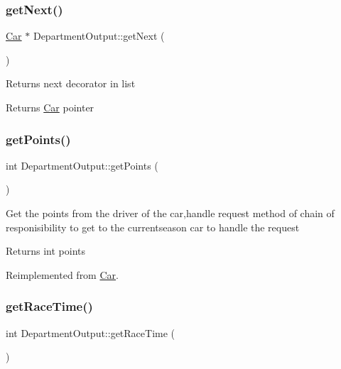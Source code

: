 \subsubsection{\texorpdfstring{get\+Next()}{getNext()}}
{\footnotesize\ttfamily \hyperlink{classCar}{Car} $\ast$ Department\+Output\+::get\+Next (\begin{DoxyParamCaption}{ }\end{DoxyParamCaption})}

Returns next decorator in list \begin{DoxyReturn}{Returns}
\hyperlink{classCar}{Car} pointer 
\end{DoxyReturn}
\mbox{\label{classDepartmentOutput_ac1eac849b183dd78906a5b2a7217b8ef}} 
\subsubsection{\texorpdfstring{get\+Points()}{getPoints()}}
{\footnotesize\ttfamily int Department\+Output\+::get\+Points (\begin{DoxyParamCaption}{ }\end{DoxyParamCaption})\hspace{0.3cm}{\ttfamily [virtual]}}

Get the points from the driver of the car,handle request method of chain of responisibility to get to the currentseason car to handle the request \begin{DoxyReturn}{Returns}
int points 
\end{DoxyReturn}


Reimplemented from \hyperlink{classCar_a0e0b71dc2b09be094ffb08e5b73c8ea2}{Car}.

\mbox{\label{classDepartmentOutput_af4807c0cdde8488cd922be5d15a0f59b}} 
\subsubsection{\texorpdfstring{get\+Race\+Time()}{getRaceTime()}}
{\footnotesize\ttfamily int Department\+Output\+::get\+Race\+Time (\begin{DoxyParamCaption}{ }\end{DoxyParamCaption})\hspace{0.3cm}{\ttfamily [virtual]}}

